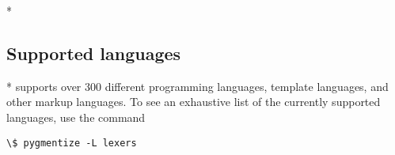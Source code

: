 \begin{paracol}{2}
\switchcolumn

\switchcolumn[0]*%
\subsection{Supported languages}
\switchcolumn

\switchcolumn[0]*%
 supports over 300 different programming languages, template languages, and other markup languages.  To see an exhaustive list of the currently supported languages, use the command

\begin{Verbatim}[commandchars=\\\{\}]
\$ pygmentize -L lexers
\end{Verbatim}

\end{paracol}